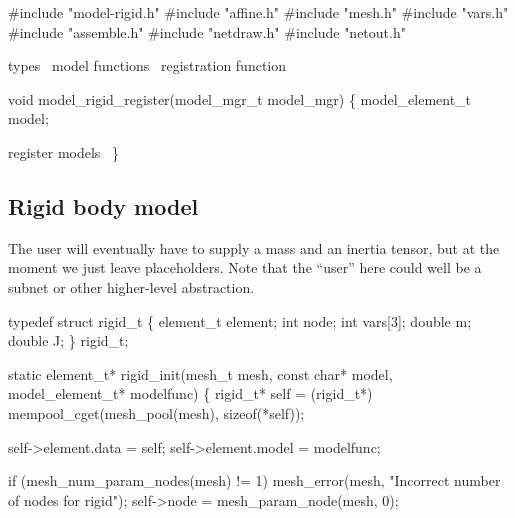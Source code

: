 #include "model-rigid.h"
#include "affine.h"
#include "mesh.h"
#include "vars.h"
#include "assemble.h"
#include "netdraw.h"
#include "netout.h"

\LA{}types~{\nwtagstyle{}}\RA{}
\LA{}model functions~{\nwtagstyle{}}\RA{}
\LA{}registration function~{\nwtagstyle{}}\RA{}
\nwendcode{}\nwdocspar

\nwenddocs{}\endmoddef
void model_rigid_register(model_mgr_t model_mgr)
\{
    model_element_t model;

    \LA{}register models~{\nwtagstyle{}}\RA{}
\}
\nwendcode{}\nwdocspar


\subsection{Rigid body model}

The user will eventually have to supply a mass and an inertia tensor,
but at the moment we just leave placeholders.  Note that the ``user''
here could well be a subnet or other higher-level abstraction.

\nwenddocs{}\endmoddef
typedef struct rigid_t \{
    element_t element;
    int node;
    int vars[3];
    double m;
    double J;
\} rigid_t;

\nwendcode{}\nwdocspar

\nwenddocs{}\endmoddef
static element_t* rigid_init(mesh_t mesh, const char* model,
                        model_element_t* modelfunc)
\{
    rigid_t* self = (rigid_t*) 
        mempool_cget(mesh_pool(mesh), sizeof(*self));

    self->element.data = self;
    self->element.model = modelfunc;

    if (mesh_num_param_nodes(mesh) != 1)
        mesh_error(mesh, "Incorrect number of nodes for rigid");
    self->node = mesh_param_node(mesh, 0);

